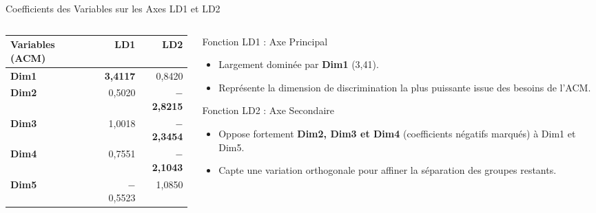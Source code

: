 \documentclass[aspectratio=169, 10pt]{beamer}
\begin{document}
\begin{frame}{Coefficients des Variables sur les Axes LD1 et LD2}
	\begin{columns}[c]
		\begin{column}{0.48\textwidth}
			\begin{center}
				\footnotesize
				\renewcommand{\arraystretch}{1.2}
				\begin{tabular}{l|rr}
					\toprule
					\textbf{Variables (ACM)} & \textbf{LD1} & \textbf{LD2} \\
					\midrule
					\textbf{Dim1} & \cellcolor{red!15}\textbf{3,4117} & 0,8420 \\
					\rowcolor{gray!5}
					\textbf{Dim2} & 0,5020 & \cellcolor{blue!15}\textbf{$-$2,8215} \\
					\textbf{Dim3} & 1,0018 & \cellcolor{blue!15}\textbf{$-$2,3454} \\
					\rowcolor{gray!5}
					\textbf{Dim4} & 0,7551 & \cellcolor{blue!15}\textbf{$-$2,1043} \\
					\textbf{Dim5} & $-$0,5523 & 1,0850 \\
					\bottomrule
				\end{tabular}
			\end{center}
		\end{column}
		
		\begin{column}{0.5\textwidth}
			\begin{block}{Fonction LD1 : Axe Principal}
				\begin{itemize}
					\scriptsize
					\item Largement dominée par \textbf{Dim1} (3,41).
					\item Représente la dimension de discrimination la plus puissante issue des besoins de l'ACM.
				\end{itemize}
			\end{block}
			
			\begin{block}{Fonction LD2 : Axe Secondaire}
				\begin{itemize}
					\scriptsize
					\item Oppose fortement \textbf{Dim2, Dim3 et Dim4} (coefficients négatifs marqués) à Dim1 et Dim5.
					\item Capte une variation orthogonale pour affiner la séparation des groupes restants.
				\end{itemize}
			\end{block}
		\end{column}
	\end{columns}
\end{frame}
\end{document}
